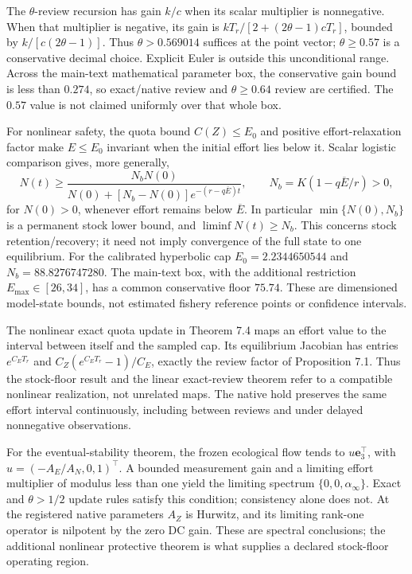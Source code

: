 \documentclass[
  10pt,
  a4paper,
]{article}
\begin{document}
The \(\theta\)-review recursion has gain \(k/c\) when its scalar
multiplier is nonnegative. When that multiplier is negative, its gain is
\(kT_r/[2+(2\theta-1)cT_r]\), bounded by \(k/[c(2\theta-1)]\). Thus
\(\theta>0.569014\) suffices at the point vector; \(\theta\ge0.57\) is a
conservative decimal choice. Explicit Euler is outside this
unconditional range. Across the main-text mathematical parameter box,
the conservative gain bound is less than \(0.274\), so exact/native
review and \(\theta\ge0.64\) review are certified. The \(0.57\) value is
not claimed uniformly over that whole box.

For nonlinear safety, the quota bound \(C(Z)\le E_0\) and positive
effort-relaxation factor make \(E\le E_0\) invariant when the initial
effort lies below it. Scalar logistic comparison gives, more generally,
\[N(t)\ge\frac{N_bN(0)}{N(0)+[N_b-N(0)]e^{-(r-q\overline E)t}},\qquad N_b=K(1-q\overline E/r)>0,\]
for \(N(0)>0\), whenever effort remains below \(\overline E\). In
particular \(\min\{N(0),N_b\}\) is a permanent stock lower bound, and
\(\liminf N(t)\ge N_b\). This concerns stock retention/recovery; it need
not imply convergence of the full state to one equilibrium. For the
calibrated hyperbolic cap \(E_0=2.2344650544\) and
\(N_b=88.8276747280\). The main-text box, with the additional
restriction \(E_{\max}\in[26,34]\), has a common conservative floor
\(75.74\). These are dimensioned model-state bounds, not estimated
fishery reference points or confidence intervals.

The nonlinear exact quota update in Theorem 7.4 maps an effort value to
the interval between itself and the sampled cap. Its equilibrium
Jacobian has entries \(e^{C_ET_r}\) and \(C_Z(e^{C_ET_r}-1)/C_E\),
exactly the review factor of Proposition 7.1. Thus the stock-floor
result and the linear exact-review theorem refer to a compatible
nonlinear realization, not unrelated maps. The native hold preserves the
same effort interval continuously, including between reviews and under
delayed nonnegative observations.

For the eventual-stability theorem, the frozen ecological flow tends to
\(u\mathbf e_3^\top\), with \(u=(-A_E/A_N,0,1)^\top\). A bounded
measurement gain and a limiting effort multiplier of modulus less than
one yield the limiting spectrum \(\{0,0,\alpha_\infty\}\). Exact and
\(\theta>1/2\) update rules satisfy this condition; consistency alone
does not. At the registered native parameters \(A_Z\) is Hurwitz, and
its limiting rank-one operator is nilpotent by the zero DC gain. These
are spectral conclusions; the additional nonlinear protective theorem is
what supplies a declared stock-floor operating region.
\end{document}
